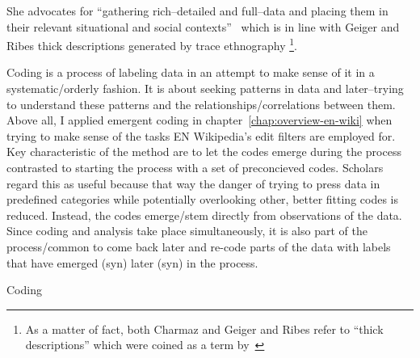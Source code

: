 She advocates for ``gathering rich–detailed and full–data and placing them in their relevant situational and social contexts''~\cite[p.10-11]{Charmaz2006} which is in line with Geiger and Ribes thick descriptions generated by trace ethnography
\footnote{As a matter of fact, both Charmaz and Geiger and Ribes refer to ``thick descriptions'' which were coined as a term by~\cite{Geertz1973}}.

Coding is a process of labeling data in an attempt to make sense of it in a systematic/orderly fashion.
It is about seeking patterns in data and later–trying to understand these patterns and the relationships/correlations between them.
Above all, I applied emergent coding in chapter~\ref{chap:overview-en-wiki} when trying to make sense of the tasks EN Wikipedia's edit filters are employed for.
Key characteristic of the method are to let the codes emerge during the process contrasted to starting the process with a set of preconcieved codes.
Scholars regard this as useful because that way the danger of trying to press data in predefined categories while potentially overlooking other, better fitting codes is reduced.
Instead, the codes emerge/stem directly from observations of the data.
Since coding and analysis take place simultaneously, it is also part of the process/common to come back later and re-code parts of the data with labels that have emerged (syn) later (syn) in the process.

Coding~\cite[42-71]{Charmaz2006}


